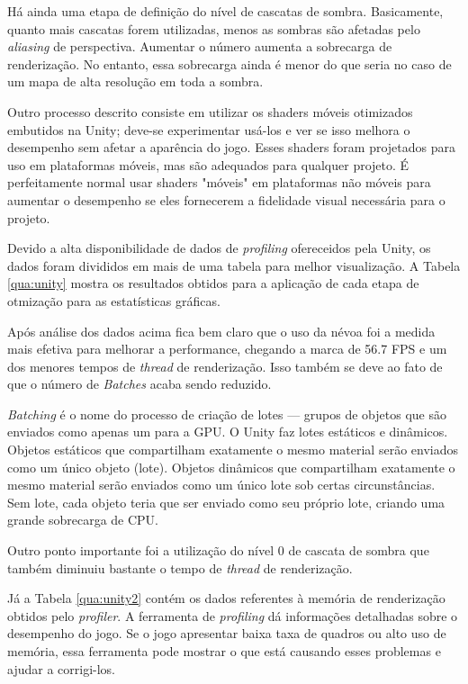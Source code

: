 Há ainda uma etapa de definição do nível de cascatas de sombra. Basicamente, quanto mais cascatas forem utilizadas, menos as sombras são afetadas pelo \textit{aliasing} de perspectiva. Aumentar o número aumenta a sobrecarga de renderização. No entanto, essa sobrecarga ainda é menor do que seria no caso de um mapa de alta resolução em toda a sombra.

Outro processo descrito consiste em utilizar os shaders móveis otimizados embutidos na Unity; deve-se experimentar usá-los e ver se isso melhora o desempenho sem afetar a aparência do jogo. Esses shaders foram projetados para uso em plataformas móveis, mas são adequados para qualquer projeto. É perfeitamente normal usar shaders "móveis" em plataformas não móveis para aumentar o desempenho se eles fornecerem a fidelidade visual necessária para o projeto.

Devido a alta disponibilidade de dados de \textit{profiling} ofereceidos pela Unity, os dados foram divididos em mais de uma tabela para melhor visualização. A Tabela \ref{qua:unity} mostra os resultados obtidos para a aplicação de cada etapa de otmização para as estatísticas gráficas.



Após análise dos dados acima fica bem claro que o uso da névoa foi a medida mais efetiva para melhorar a performance, chegando a marca de 56.7 FPS e um dos menores tempos de \textit{thread} de renderização. Isso também se deve ao fato de que o número de \textit{Batches} acaba sendo reduzido.

\textit{Batching} é o nome do processo de criação de lotes --- grupos de objetos que são enviados como apenas um para a GPU. O Unity faz lotes estáticos e dinâmicos. Objetos estáticos que compartilham exatamente o mesmo material serão enviados como um único objeto (lote). Objetos dinâmicos que compartilham exatamente o mesmo material serão enviados como um único lote sob certas circunstâncias. Sem lote, cada objeto teria que ser enviado como seu próprio lote, criando uma grande sobrecarga de CPU.

Outro ponto importante foi a utilização do nível 0 de cascata de sombra que também diminuiu bastante o tempo de \textit{thread} de renderização.

Já a Tabela \ref{qua:unity2} contém os dados referentes à memória de renderização obtidos pelo \textit{profiler}. A ferramenta de \textit{profiling} dá informações detalhadas sobre o desempenho do jogo. Se o jogo apresentar baixa taxa de quadros ou alto uso de memória, essa ferramenta pode mostrar o que está causando esses problemas e ajudar a corrigi-los.

